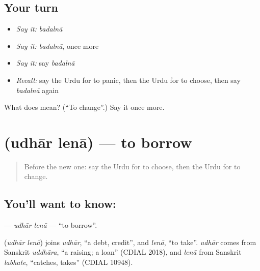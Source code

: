 \subsection*{Your turn}
\begin{itemize}
\raggedright
  \item \emph{Say it:} \emph{badalnā}
  \item \emph{Say it:} \emph{badalnā}, once more
  \item \emph{Say it:} say \emph{badalnā}
  \item \emph{Recall:} say the Urdu for to panic, then the Urdu for to choose, then say \emph{badalnā} again
\end{itemize}

\begin{tcolorbox}[breakable,colback=teal!4,colframe=teal!35!black,title={Before you move on}]
What does  mean? (\textquotedblleft{}To change\textquotedblright{}.) Say it once more.
\end{tcolorbox}
\section[\texorpdfstring{\ur{ادھار} \ur{لینا} (udhār lenā)}{ادھار لینا (udhār lenā)}]{  (udhār lenā) — to borrow}

\label{lesson:UR-C148-udhar-lena}



\begin{quote}
Before the new one: say the Urdu for to choose, then the Urdu for to change.
\end{quote}

\subsection*{You'll want to know:  }
\textbf{ } — \emph{udhār lenā} — \textquotedblleft{}to borrow\textquotedblright{}.

\begin{cousinweb}
\textbf{ } (\emph{udhār lenā}) joins \emph{udhār}, \textquotedblleft{}a debt, credit\textquotedblright{}, and \emph{lenā}, \textquotedblleft{}to take\textquotedblright{}. \emph{udhār} comes from Sanskrit \emph{uddhāra}, \textquotedblleft{}a raising; a loan\textquotedblright{} (CDIAL 2018), and \emph{lenā} from Sanskrit \emph{labhate}, \textquotedblleft{}catches, takes\textquotedblright{} (CDIAL 10948).
\end{cousinweb}

